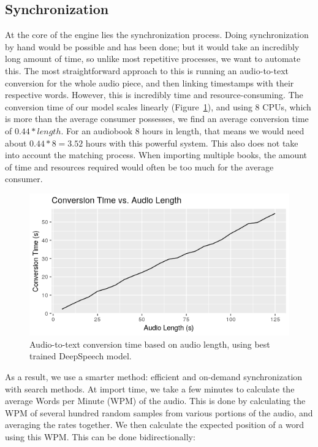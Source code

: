 \documentclass[10pt,twocolumn,letterpaper]{article}
\begin{document}
\subsection{Synchronization}
At the core of the engine lies the synchronization process. Doing synchronization by hand would be possible and has been done; but it would take an incredibly long amount of time, so unlike most repetitive processes, we want to automate this. The most straightforward approach to this is running an audio-to-text conversion for the whole audio piece, and then linking timestamps with their respective words. However, this is incredibly time and resource-consuming. The conversion time of our model scales linearly (Figure~\ref{fig:convtime-length}), and using 8 CPUs, which is more than the average consumer possesses, we find an average conversion time of $0.44 * length$. For an audiobook 8 hours in length, that means we would need about $0.44 * 8 = 3.52$ hours with this powerful system. This also does not take into account the matching process. When importing multiple books, the amount of time and resources required would often be too much for the average consumer.

\begin{figure}
\centering
\includegraphics[width=\columnwidth]{img/conversion_time_from_audio_length}\newline
\caption{Audio-to-text conversion time based on audio length, using best trained DeepSpeech model.}
\label{fig:convtime-length}
\end{figure}

As a result, we use a smarter method: efficient and on-demand synchronization with search methods. At import time, we take a few minutes to calculate the average Words per Minute (WPM) of the audio. This is done by calculating the WPM of several hundred random samples from various portions of the audio, and averaging the rates together. We then calculate the expected position of a word using this WPM. This can be done bidirectionally:
\end{document}
